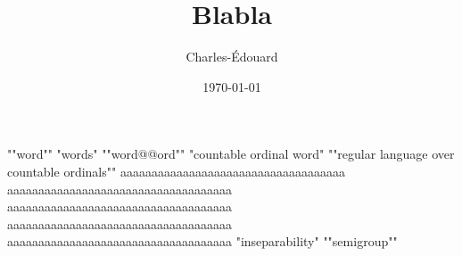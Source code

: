\documentclass{article}
\title{Blabla}
\date{\today}
\author{Charles-Édouard}
\begin{document}
\maketitle

\AP ""word""
"words"
""word@@ord""
"countable ordinal word"
""regular language over countable ordinals""
aaaaaaaaaaaaaaaaaaaaaaaaaaaaaaaaaaaa
aaaaaaaaaaaaaaaaaaaaaaaaaaaaaaaaaaaa
aaaaaaaaaaaaaaaaaaaaaaaaaaaaaaaaaaaa
aaaaaaaaaaaaaaaaaaaaaaaaaaaaaaaaaaaa
aaaaaaaaaaaaaaaaaaaaaaaaaaaaaaaaaaaa
"inseparability"
""semigroup""
\end{document}
